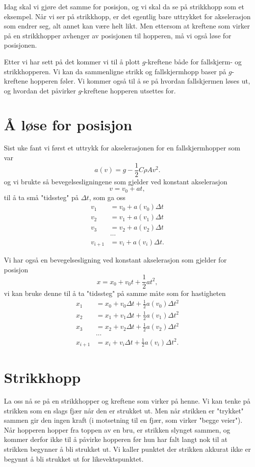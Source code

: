 \documentclass[a4paper, 11pt, notitlepage]{article}
\begin{document}
Idag skal vi gjøre det samme for posisjon, og vi skal da se på strikkhopp som et eksempel. Når vi ser på strikkhopp, er det egentlig bare uttrykket for akselerasjon som endrer seg, alt annet kan være helt likt. Men ettersom at kreftene som virker på en strikkhopper avhenger av posisjonen til hopperen, må vi også løse for posisjonen.

Etter vi har sett på det kommer vi til å plott $g$-kreftene både for fallskjerm- og strikkhopperen. Vi kan da sammenligne strikk og fallskjermhopp baser på $g$-kreftene hopperen føler. Vi kommer også til å se på hvordan fallskjermen løses ut, og hvordan det påvirker $g$-kreftene hopperen utsettes for.

\clearpage

\section*{Å løse for posisjon}
Sist uke fant vi først et uttrykk for akselerasjonen for en fallskjermhopper som var
$$a(v) = g - \frac{1}{2}C\rho A v^2.$$
og vi brukte så bevegelsesligningene som gjelder ved konstant akselerasjon
$$v = v_0 + a t,$$
til å ta små "tidssteg" på $\Delta t$, som ga oss
\begin{align*}
v_1 &= v_0 + a(v_0)\Delta t \\  
v_2 &= v_1 + a(v_1)\Delta t \\
v_3 &= v_2 + a(v_2)\Delta t \\
&\hdots \\
v_{i+1} &= v_i + a(v_i)\Delta t.
\end{align*}

Vi har også en bevegelsesligning ved konstant akselerasjon som gjelder for posisjon
$$x = x_0 + v_0 t + \frac{1}{2}at^2,$$
vi kan bruke denne til å ta "tidssteg" på samme måte som for hastigheten
\begin{align*}
x_1 &= x_0  + v_0 \Delta t + \frac{1}{2} a(v_0) \Delta t^2 \\  
x_2 &= x_1  + v_1 \Delta t + \frac{1}{2} a(v_1) \Delta t^2 \\  
x_3 &= x_2  + v_2 \Delta t + \frac{1}{2} a(v_2) \Delta t^2 \\  
&\hdots \\
x_{i+1} &= x_i + v_i\Delta t + \frac{1}{2} a(v_i)\Delta t^2.
\end{align*}

\clearpage

\section*{Strikkhopp}
La oss nå se på en strikkhopper og kreftene som virker på henne. Vi kan tenke på strikken som en slags fjær når den er strukket ut. Men når strikken er "trykket" sammen gir den ingen kraft (i motsetning til en fjær, som virker "begge veier"). Når hopperen hopper fra toppen av en bru, er strikken slynget sammen, og kommer derfor ikke til å påvirke hopperen før hun har falt langt nok til at strikken begynner å bli strukket ut.  Vi kaller punktet der strikken akkurat ikke er begynnt å bli strukket ut for likevektspunktet.
\end{document}
